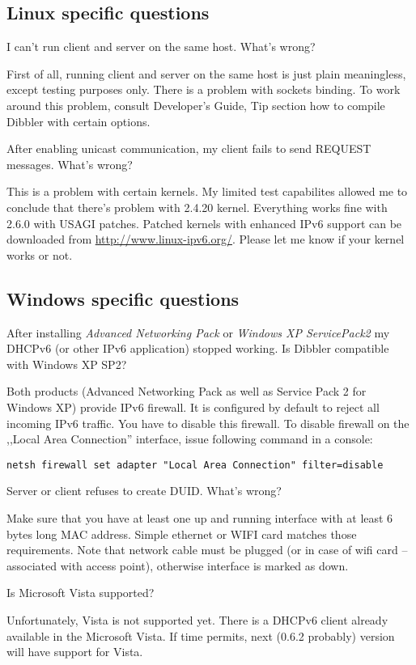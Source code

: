 \subsection{Linux specific questions}

\Q I can't run client and server on the same host. What's wrong?

\A First of all, running client and server on the same host is just
plain meaningless, except testing purposes only. There is a problem
with sockets binding. To work around this problem, consult Developer's
Guide, Tip section how to compile Dibbler with certain options.

\Q After enabling unicast communication, my client fails to send
REQUEST messages. What's wrong?

\A This is a problem with certain kernels. My limited test capabilites
allowed me to conclude that there's problem with 2.4.20
kernel. Everything works fine with 2.6.0 with USAGI patches. Patched 
kernels with enhanced IPv6 support can be downloaded from
\url{http://www.linux-ipv6.org/}. Please let me know if your kernel
works or not.

\subsection{Windows specific questions}

\Q After installing \emph{Advanced Networking Pack} or \emph{Windows XP
  ServicePack2} my DHCPv6 (or other IPv6 application) stopped
   working. Is Dibbler compatible with Windows XP SP2?

\A Both products (Advanced Networking Pack as well as Service Pack 2
for Windows XP) provide IPv6 firewall. It is configured by default to
reject all incoming IPv6 traffic. You have to disable this
firewall. To disable firewall on the ,,Local Area Connection''
interface, issue following command in a console:

\begin{verbatim}
netsh firewall set adapter "Local Area Connection" filter=disable
\end{verbatim}

\Q Server or client refuses to create DUID. What's wrong?

\A Make sure that you have at least one up and running interface with
at least 6 bytes long MAC address. Simple ethernet or WIFI card
matches those requirements. Note that network cable must be plugged
(or in case of wifi card -- associated with access point), otherwise
interface is marked as down.

\Q Is Microsoft Vista supported?

\A Unfortunately, Vista is not supported yet. There is a DHCPv6 client
already available in the Microsoft Vista. If time permits, next (0.6.2
probably) version will have support for Vista.


